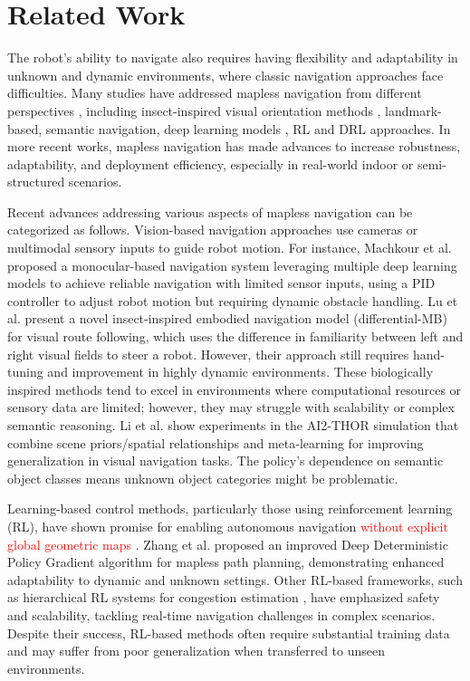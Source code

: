 \documentclass[robotics,article,submit,pdftex,moreauthors]{Definitions/mdpi}
\begin{document}
\section{Related Work} \label{sec:rel_work} 

The robot's ability to navigate also requires having flexibility and adaptability in unknown and dynamic environments, where classic navigation approaches face difficulties. Many studies have addressed mapless navigation from different perspectives \citep{Mapless-Survey}, including insect-inspired visual orientation methods \citep{wang-2024}, landmark-based, semantic navigation, deep learning models \citep{SnapNav}, RL and DRL approaches\citep{CrowdMove, Target-driven, Automatic-Curr-L}. In more recent works, mapless navigation has made advances to increase robustness, adaptability, and deployment efficiency, especially in real-world indoor or semi-structured scenarios\citep{10.1007/978-3-031-63596-0_22}.

Recent advances addressing various aspects of mapless navigation can be categorized as follows. Vision-based navigation approaches use cameras or multimodal sensory inputs to guide robot motion. For instance, Machkour et al. \citep{Machkour2023} proposed a monocular-based navigation system leveraging multiple deep learning models to achieve reliable navigation with limited sensor inputs, using a PID controller to adjust robot motion but requiring dynamic obstacle handling. Lu et al. \citep{Lu2025} present a novel insect-inspired embodied navigation model (differential-MB) for visual route following, which uses the difference in familiarity between left and right visual fields to steer a robot. However, their approach still requires hand-tuning and improvement in highly dynamic environments. These biologically inspired methods tend to excel in environments where computational resources or sensory data are limited; however, they may struggle with scalability or complex semantic reasoning. Li et al. \citep{LI2021368} show experiments in the AI2‑THOR simulation that combine scene priors/spatial relationships and meta‑learning for improving generalization in visual navigation tasks. The policy’s dependence on semantic object classes means unknown object categories might be problematic.

Learning-based control methods, particularly those using reinforcement learning (RL), have shown promise for enabling autonomous navigation \textcolor{red}{without explicit global geometric maps} \citep{10776999}. Zhang et al. \citep{s24175667} proposed an improved Deep Deterministic Policy Gradient algorithm for mapless path planning, demonstrating enhanced adaptability to dynamic and unknown settings. Other RL-based frameworks, such as hierarchical RL systems for congestion estimation \citep{gao2025hierarchicalreinforcementlearningsafe}, have emphasized safety and scalability, tackling real-time navigation challenges in complex scenarios. Despite their success, RL-based methods often require substantial training data and may suffer from poor generalization when transferred to unseen environments.
\end{document}
